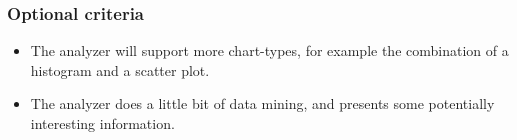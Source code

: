 \subsubsection{Optional criteria}
\begin{itemize}
\item The analyzer will support more chart-types, for example the combination of
a \gls{histogram} and a \gls{scatter plot}. 
\item The analyzer does a little bit of data mining, and presents some potentially interesting information.
\end{itemize}






